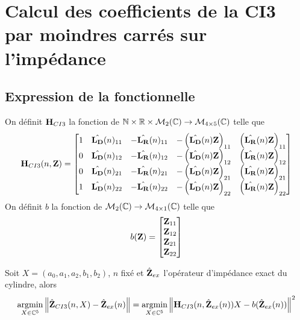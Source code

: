 \section{Calcul des coefficients de la CI3 par moindres carrés sur l'impédance}

  \subsection{Expression de la fonctionnelle}

    \begin{defn}
      On définit \(\mathbf{H}_{CI3}\) la fonction de \(\mathbb N \times \mathbb R \times \mathcal{M}_2(\mathbb C) \rightarrow \mathcal{M}_{4\times5}(\mathbb C)\) telle que
      \begin{equation*}
        \mathbf{H}_{CI3}(n,\mathbf{Z}) = \begin{bmatrix}
        1 & \hat{\mathbf{L_D}}(n)_{11} & -\hat{\mathbf{L_R}}(n)_{11} & -\left(\hat{\mathbf{L_D}}(n){\mathbf{Z}}\right)_{11} & \left(\hat{\mathbf{L_R}}(n){\mathbf{Z}}\right)_{11}
        \\
        0 & \hat{\mathbf{L_D}}(n)_{12} & -\hat{\mathbf{L_R}}(n)_{12} & -\left(\hat{\mathbf{L_D}}(n){\mathbf{Z}}\right)_{12} & \left(\hat{\mathbf{L_R}}(n){\mathbf{Z}}\right)_{12}
        \\
        0 & \hat{\mathbf{L_D}}(n)_{21} & -\hat{\mathbf{L_R}}(n)_{21} & -\left(\hat{\mathbf{L_D}}(n){\mathbf{Z}}\right)_{21} & \left(\hat{\mathbf{L_R}}(n){\mathbf{Z}}\right)_{21}
        \\
        1 & \hat{\mathbf{L_D}}(n)_{22} & -\hat{\mathbf{L_R}}(n)_{22} & -\left(\hat{\mathbf{L_D}}(n){\mathbf{Z}}\right)_{22} & \left(\hat{\mathbf{L_R}}(n){\mathbf{Z}}\right)_{22}
        \end{bmatrix}
      \end{equation*}
      On définit \(b\) la fonction de \(\mathcal{M}_2(\mathbb C) \rightarrow \mathcal{M}_{4\times1}(\mathbb C)\) telle que
      \begin{equation*}
        b(\mathbf{Z}) = \begin{bmatrix}
        {\mathbf{Z}}_{11}
        \\
        {\mathbf{Z}}_{12}
        \\
        {\mathbf{Z}}_{21}
        \\
        {\mathbf{Z}}_{22}
        \end{bmatrix}
      \end{equation*}
    \end{defn}

    \begin{prop}
      Soit \(X = (a_0,a_1,a_2,b_1,b_2)\), \(n\) fixé et \(\hat{\mathbf{Z}}_{ex}\) l'opérateur d'impédance exact du cylindre, alors
      \begin{equation*}
        {\underset{X\in\mathbb C^5}{\operatorname{argmin}}} \left\lVert\hat{\mathbf{Z}}_{CI3}(n,X) - \hat{\mathbf{Z}}_{ex}(n)\right\rVert = {\underset{X\in\mathbb C^5}{\operatorname{argmin}}} \left\lVert\mathbf{H}_{CI3}(n,\hat{\mathbf{Z}}_{ex}(n))X - b(\hat{\mathbf{Z}}_{ex}(n))\right\rVert^2
      \end{equation*}
    \end{prop}

